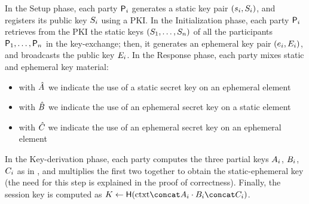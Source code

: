 In the Setup phase, each party $\User[i]$ generates a static key pair $(\ssk_i,\spk_i)$, and registers its public key $\spk_i$ using a PKI.
In the Initialization phase, each party $\User[i]$ retrieves from the PKI the static keys $(\spk_1,\dots,\spk_n)$ of all the participants $\User[1],\dots,\User[n]$  in the key-exchange; then, it generates an ephemeral key pair $(\esk_i,\epk_i)$, and broadcasts the public key $\epk_i$. 
In the Response phase, each party mixes static and ephemeral key material:
\begin{itemize}
	\item with $\tempsek{}$ we indicate the use of a static secret key on an ephemeral element
	\item with $\tempesk{}$ we indicate the use of an ephemeral secret key on a static element
	\item with $\tempeek{}$ we indicate the use of an ephemeral secret key on an ephemeral element
\end{itemize}
In the Key-derivation phase, each party computes the three partial keys $\groupsek{i}$, $\groupesk{i}$, $\groupeek{i}$ as in , and multiplies the first two together to obtain the static-ephemeral key (the need for this step is explained in the proof of correctness).
Finally, the session key is computed as $K \gets \FSHash (\context \concat \groupsek{i} \cdot \groupesk{i} \concat \groupeek{i})$.

